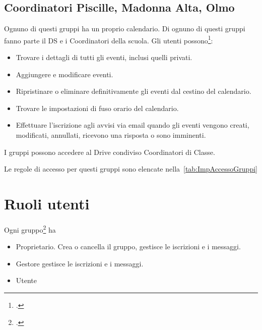 \subsection{Coordinatori Piscille, Madonna Alta, Olmo}
Ognuno di questi gruppi ha un proprio calendario. Di ognuno di questi gruppi fanno parte il DS e i Coordinatori della scuola. Gli utenti possono\footcite{Google2023g}:
\begin{itemize}
	\item Trovare i dettagli di tutti gli eventi, inclusi quelli privati.
	\item Aggiungere e modificare eventi.
	\item Ripristinare o eliminare definitivamente gli eventi dal cestino del calendario.
	\item Trovare le impostazioni di fuso orario del calendario.
	\item Effettuare l'iscrizione agli avvisi via email quando gli eventi vengono creati, modificati, annullati, ricevono una risposta o sono imminenti.
\end{itemize}

I gruppi possono accedere al Drive condiviso Coordinatori di Classe.

Le  regole di accesso per questi gruppi sono elencate nella~\cref{tab:ImpAccessoGruppi}
\section{Ruoli utenti}
Ogni gruppo\footcite{Google2023e} ha 
\begin{itemize}
	\item Proprietario. Crea o cancella il gruppo, gestisce le iscrizioni e i messaggi. 
	\item Gestore gestisce le iscrizioni e i messaggi. 
	\item Utente
\end{itemize}

